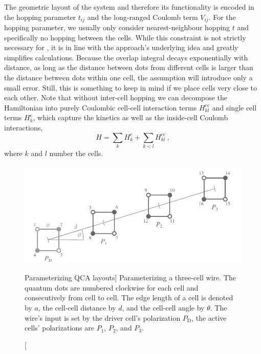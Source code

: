 The geometric layout of the  system and therefore its functionality is
encoded in the hopping parameter $t_{ij}$ and the long-ranged Coulomb term
$V_{ij}$. For the hopping parameter, we usually only consider nearest-neighbour
hopping $t$ and specifically no hopping between the cells. While this constraint
is not strictly necessary for , it is in line with the approach's
underlying idea and greatly simplifies calculations. Because the overlap
integral decays exponentially with distance, as long as the distance between
dots from different cells is larger than the distance between dots within one
cell, the assumption will introduce only a small error. Still, this is something
to keep in mind if we place cells very close to each other. Note that without
inter-cell hopping we can decompose the Hamiltonian into purely Coulombic
cell-cell interaction terms $H^\text{cc}_{kl}$ and single cell terms $H^\text{c}_k$, which
capture the kinetics as well as the inside-cell Coulomb interactions,
\begin{equation}
  \label{eq:H_cell}
  H = \sum_k H^\text{c}_k + \sum_{k<l} H^\text{cc}_{kl} \, ,
\end{equation}
where $k$ and $l$ number the cells. 

\begin{figure}
  \center
  \includegraphics{short_wire}
  \caption
  [Parameterizing QCA layouts]
  {
  \label{fig:short_wire}
  Parameterizing a three-cell  wire. The quantum dots are numbered
  clockwise for each cell and consecutively from cell to cell. The edge length
  of a  cell is denoted by $a$, the cell-cell distance by $d$, and the
  cell-cell angle by $\theta$. The wire's input is set by the driver cell's
  polarization $P_\text{D}$, the active cells' polarizations are $P_1$, $P_2$, and
  $P_3$.
  }
\end{figure}

